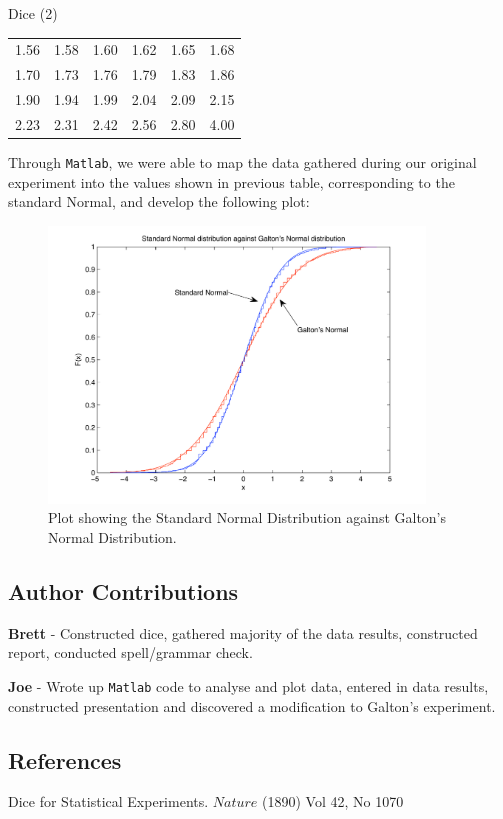 Dice (2)
\begin{tabular}{|cccccc|}\hline
1.56&	1.58&	1.60&	1.62&	1.65&	1.68\\
1.70	&1.73&	1.76&	1.79&	1.83&	1.86\\
1.90&	1.94	&1.99	&2.04&	2.09	&2.15\\
2.23	&2.31	&2.42&	2.56&	2.80	&4.00\\\hline
\end{tabular}




Through {\tt Matlab}, we were able to map the data gathered during our original experiment into the values shown in previous table, corresponding to the standard Normal, and develop the following plot: 

\begin{figure}[thp]
\begin{center}
\includegraphics[width=10cm]{figures/GaltonDice_standardnormal_against_galtons_normal.pdf}
\caption{Plot showing the Standard Normal Distribution against Galton's Normal Distribution.}
\end{center}
\end{figure}


\subsection*{Author Contributions}
\textbf{Brett} - Constructed dice, gathered majority of the data results, constructed report, conducted spell/grammar check.

\noindent
\textbf{Joe} - Wrote up {\tt Matlab} code to analyse and plot data, entered in data results, constructed presentation and discovered a modification to Galton's experiment.  


\subsection*{References}
Dice for Statistical Experiments. $Nature$ (1890) Vol 42, No 1070

